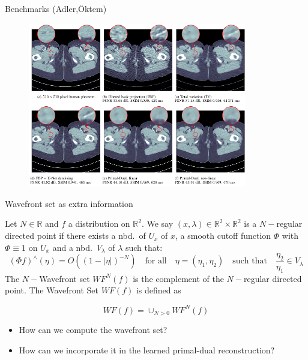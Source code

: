 \begin{frame}{Benchmarks (Adler,\"Oktem)}
\begin{figure}[!tbp]
  \centering
    \includegraphics[width= 0.85\textwidth]{Images/lpdrec.png}
\end{figure}
\end{frame}


\begin{frame}{Wavefront set as extra information}
\begin{definition}
Let $N\in\mathbb{R}$ and $f$ a distribution on $\mathbb{R}^2$. We say $(x,\lambda)\in \mathbb{R}^2\times \mathbb{R}^2$ is a $N-$regular directed point if there exists a nbd.\ of $U_x$ of $x$, a smooth cutoff function $\Phi$ with $\Phi\equiv 1$ on $U_x$ and a nbd.\ $V_{\lambda}$ of $\lambda$ such that:
$$
(\Phi f)^{\wedge}(\eta)=O((1-|\eta|)^{-N}) \quad \text{for all}\quad \eta=(\eta_1,\eta_2) \quad \text{such that}\quad \frac{\eta_2}{\eta_1}\in V_{\lambda}
$$
The $N-$Wavefront set $WF^N(f)$ is the complement of the $N-$regular directed point. The Wavefront Set $WF(f)$ is defined as 

\begin{equation}
\label{eq:Wavefront-set}
WF(f)=\cup_{N>0}WF^N(f)
\end{equation}
\end{definition}

\pause
\bigskip
\begin{itemize}
\item How can we compute the wavefront set?
\item How can we incorporate it in the learned primal-dual reconstruction?
\end{itemize}
\end{frame}


